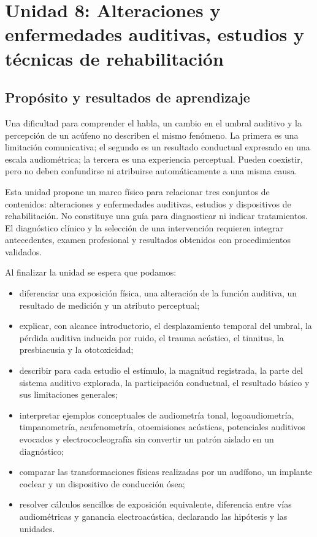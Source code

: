 \chapter[Unidad 8: Enfermedades y estudios auditivos, técnicas de rehabilitación]{Unidad 8: Alteraciones y enfermedades auditivas, estudios y técnicas de rehabilitación}
\label{chap:unidad-8}

\section{Propósito y resultados de aprendizaje}
\label{sec:u8-proposito}

Una dificultad para comprender el habla, un cambio en el umbral auditivo y
la percepción de un acúfeno no describen el mismo fenómeno. La primera es
una limitación comunicativa; el segundo es un resultado conductual expresado
en una escala audiométrica; la tercera es una experiencia perceptual. Pueden
coexistir, pero no deben confundirse ni atribuirse automáticamente a una
misma causa.

Esta unidad propone un marco físico para relacionar tres conjuntos de
contenidos: alteraciones y enfermedades auditivas, estudios y dispositivos de
rehabilitación. No constituye una guía para diagnosticar ni indicar
tratamientos. El diagnóstico clínico y la selección de una intervención
requieren integrar antecedentes, examen profesional y resultados obtenidos
con procedimientos validados.

Al finalizar la unidad se espera que podamos:

\begin{itemize}
    \item diferenciar una exposición física, una alteración de la función
    auditiva, un resultado de medición y un atributo perceptual;
    \item explicar, con alcance introductorio, el desplazamiento temporal
    del umbral, la pérdida auditiva inducida por ruido, el trauma acústico,
    el tinnitus, la presbiacusia y la ototoxicidad;
    \item describir para cada estudio el estímulo, la magnitud registrada,
    la parte del sistema auditivo explorada, la participación conductual, el
    resultado básico y sus limitaciones generales;
    \item interpretar ejemplos conceptuales de audiometría tonal,
    logoaudiometría, timpanometría, acufenometría, otoemisiones acústicas,
    potenciales auditivos evocados y electrococleografía sin convertir un
    patrón aislado en un diagnóstico;
    \item comparar las transformaciones físicas realizadas por un audífono,
    un implante coclear y un dispositivo de conducción ósea;
    \item resolver cálculos sencillos de exposición equivalente, diferencia
    entre vías audiométricas y ganancia electroacústica, declarando las
    hipótesis y las unidades.
\end{itemize}

